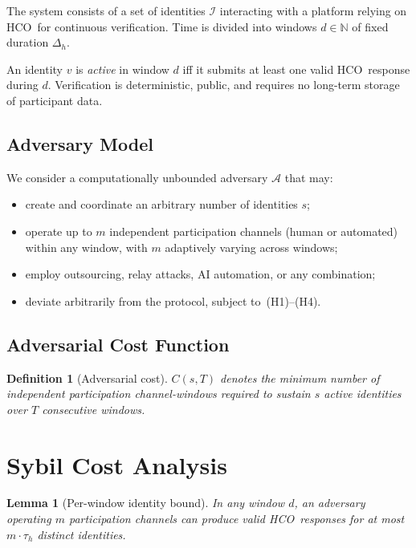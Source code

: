 \documentclass[11pt]{article}
\newcommand{\HCO}{HCO\xspace}
\newtheorem{lemma}{Lemma}
\newtheorem{definition}{Definition}
\theoremstyle{remark}
\theoremstyle{plain}
\begin{document}
	The system consists of a set of identities $\mathcal{I}$ interacting with
	a platform relying on \HCO\ for continuous verification. Time is divided
	into windows $d \in \mathbb{N}$ of fixed duration $\Delta_h$.
	
	An identity $v$ is \emph{active} in window $d$ iff it submits at least
	one valid \HCO\ response during $d$. Verification is deterministic,
	public, and requires no long-term storage of participant data.
	
	\subsection{Adversary Model}
	
	We consider a computationally unbounded adversary $\mathcal{A}$ that may:
	\begin{itemize}
		\item create and coordinate an arbitrary number of identities $s$;
		\item operate up to $m$ independent participation channels (human or
		automated) within any window, with $m$ adaptively varying across windows;
		\item employ outsourcing, relay attacks, AI automation, or any combination;
		\item deviate arbitrarily from the protocol, subject to~(H1)--(H4).
	\end{itemize}
	
	\subsection{Adversarial Cost Function}
	
	\begin{definition}[Adversarial cost]
		$C(s, T)$ denotes the minimum number of independent participation
		channel-windows required to sustain $s$ active identities over $T$
		consecutive windows.
	\end{definition}
	
	
	\section{Sybil Cost Analysis}
	\label{sec:cost}
	
	\begin{lemma}[Per-window identity bound]
		\label{lem:identity-bound}
		In any window $d$, an adversary operating $m$ participation channels
		can produce valid \HCO\ responses for at most $m \cdot \tau_h$
		distinct identities.
	\end{lemma}
	
\end{document}
